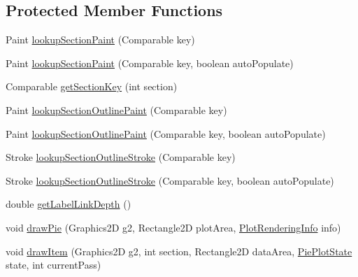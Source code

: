 \subsection*{Protected Member Functions}
\begin{DoxyCompactItemize}
\item 
Paint \mbox{\hyperlink{classorg_1_1jfree_1_1chart_1_1plot_1_1_pie_plot_a4b18bc37829ff565c72d2bdd1acd0bb7}{lookup\+Section\+Paint}} (Comparable key)
\item 
Paint \mbox{\hyperlink{classorg_1_1jfree_1_1chart_1_1plot_1_1_pie_plot_a357b84f6fadc1271562d3b64f40eeabe}{lookup\+Section\+Paint}} (Comparable key, boolean auto\+Populate)
\item 
Comparable \mbox{\hyperlink{classorg_1_1jfree_1_1chart_1_1plot_1_1_pie_plot_abd2f7b99ea65df676dcf19bcec2d7979}{get\+Section\+Key}} (int section)
\item 
Paint \mbox{\hyperlink{classorg_1_1jfree_1_1chart_1_1plot_1_1_pie_plot_a313892afd8de6bc0452c5c8c06d076fc}{lookup\+Section\+Outline\+Paint}} (Comparable key)
\item 
Paint \mbox{\hyperlink{classorg_1_1jfree_1_1chart_1_1plot_1_1_pie_plot_a929b678054fb2b30eba6a91120eceed6}{lookup\+Section\+Outline\+Paint}} (Comparable key, boolean auto\+Populate)
\item 
Stroke \mbox{\hyperlink{classorg_1_1jfree_1_1chart_1_1plot_1_1_pie_plot_a4d772d7522bd8413a7d03d2b70491560}{lookup\+Section\+Outline\+Stroke}} (Comparable key)
\item 
Stroke \mbox{\hyperlink{classorg_1_1jfree_1_1chart_1_1plot_1_1_pie_plot_a91ad548495d40424393ffb1072a3c958}{lookup\+Section\+Outline\+Stroke}} (Comparable key, boolean auto\+Populate)
\item 
double \mbox{\hyperlink{classorg_1_1jfree_1_1chart_1_1plot_1_1_pie_plot_a7eabe09e7a9aac61bfd229a8d107af12}{get\+Label\+Link\+Depth}} ()
\item 
void \mbox{\hyperlink{classorg_1_1jfree_1_1chart_1_1plot_1_1_pie_plot_a463f03d62a216ffff9780fdf358b30e5}{draw\+Pie}} (Graphics2D g2, Rectangle2D plot\+Area, \mbox{\hyperlink{classorg_1_1jfree_1_1chart_1_1plot_1_1_plot_rendering_info}{Plot\+Rendering\+Info}} info)
\item 
void \mbox{\hyperlink{classorg_1_1jfree_1_1chart_1_1plot_1_1_pie_plot_a08031cd2d8b99814d8a5aa3cd3e7fcfe}{draw\+Item}} (Graphics2D g2, int section, Rectangle2D data\+Area, \mbox{\hyperlink{classorg_1_1jfree_1_1chart_1_1plot_1_1_pie_plot_state}{Pie\+Plot\+State}} state, int current\+Pass)
\item 

\end{DoxyCompactItemize}
